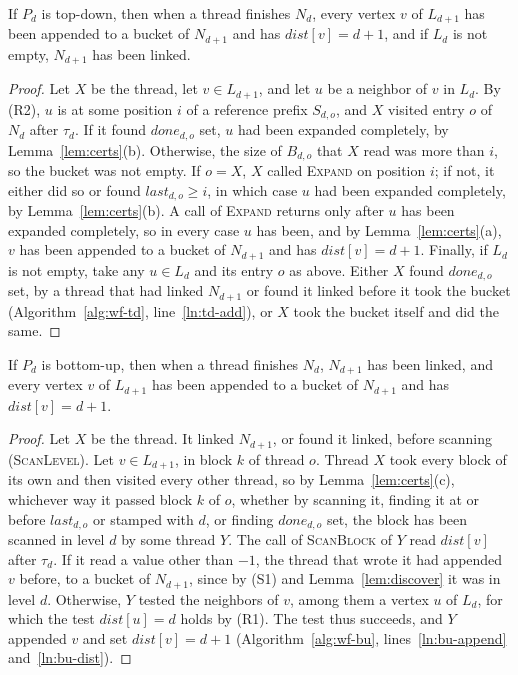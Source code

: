 \begin{lemma}
\label{lem:td-complete}
If $P_d$ is top-down, then when a thread finishes $N_d$, every vertex $v$ of $L_{d+1}$ has been appended to a bucket of $N_{d+1}$ and has $\mathit{dist}[v] = d+1$, and if $L_d$ is not empty, $N_{d+1}$ has been linked.
\end{lemma}
\begin{proof}
Let $X$ be the thread, let $v \in L_{d+1}$, and let $u$ be a neighbor of $v$ in $L_d$. By (R2), $u$ is at some position $i$ of a reference prefix $S_{d,o}$, and $X$ visited entry $o$ of $N_d$ after $\tau_d$. If it found $\mathit{done}_{d,o}$ set, $u$ had been expanded completely, by Lemma~\ref{lem:certs}(b). Otherwise, the size of $B_{d,o}$ that $X$ read was more than $i$, so the bucket was not empty. If $o = X$, $X$ called \textsc{Expand} on position $i$; if not, it either did so or found $\mathit{last}_{d,o} \geq i$, in which case $u$ had been expanded completely, by Lemma~\ref{lem:certs}(b). A call of \textsc{Expand} returns only after $u$ has been expanded completely, so in every case $u$ has been, and by Lemma~\ref{lem:certs}(a), $v$ has been appended to a bucket of $N_{d+1}$ and has $\mathit{dist}[v] = d+1$. Finally, if $L_d$ is not empty, take any $u \in L_d$ and its entry $o$ as above. Either $X$ found $\mathit{done}_{d,o}$ set, by a thread that had linked $N_{d+1}$ or found it linked before it took the bucket (Algorithm~\ref{alg:wf-td}, line~\ref{ln:td-add}), or $X$ took the bucket itself and did the same.
\end{proof}

\begin{lemma}
\label{lem:bu-complete}
If $P_d$ is bottom-up, then when a thread finishes $N_d$, $N_{d+1}$ has been linked, and every vertex $v$ of $L_{d+1}$ has been appended to a bucket of $N_{d+1}$ and has $\mathit{dist}[v] = d+1$.
\end{lemma}
\begin{proof}
Let $X$ be the thread. It linked $N_{d+1}$, or found it linked, before scanning (\textsc{ScanLevel}). Let $v \in L_{d+1}$, in block $k$ of thread $o$. Thread $X$ took every block of its own and then visited every other thread, so by Lemma~\ref{lem:certs}(c), whichever way it passed block $k$ of $o$, whether by scanning it, finding it at or before $\mathit{last}_{d,o}$ or stamped with $d$, or finding $\mathit{done}_{d,o}$ set, the block has been scanned in level $d$ by some thread $Y$. The call of \textsc{ScanBlock} of $Y$ read $\mathit{dist}[v]$ after $\tau_d$. If it read a value other than $-1$, the thread that wrote it had appended $v$ before, to a bucket of $N_{d+1}$, since by (S1) and Lemma~\ref{lem:discover} it was in level $d$. Otherwise, $Y$ tested the neighbors of $v$, among them a vertex $u$ of $L_d$, for which the test $\mathit{dist}[u] = d$ holds by (R1). The test thus succeeds, and $Y$ appended $v$ and set $\mathit{dist}[v] = d+1$ (Algorithm~\ref{alg:wf-bu}, lines~\ref{ln:bu-append} and~\ref{ln:bu-dist}).
\end{proof}

